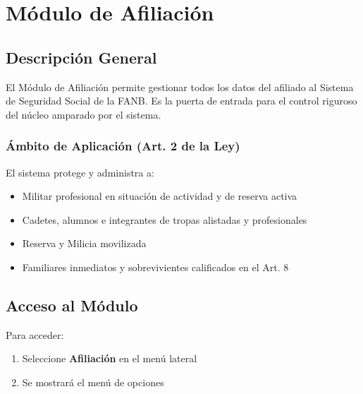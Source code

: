 
\chapter{Módulo de Afiliación}
\label{ch:afiliacion}

\section{Descripción General}

El Módulo de Afiliación permite gestionar todos los datos del afiliado al Sistema de Seguridad Social de la FANB. Es la puerta de entrada para el control riguroso del núcleo amparado por el sistema.

\subsection*{Ámbito de Aplicación (Art. 2 de la Ley)}

El sistema protege y administra a:

\begin{itemize}[leftmargin=*]
    \item Militar profesional en situación de actividad y de reserva activa
    \item Cadetes, alumnos e integrantes de tropas alistadas y profesionales
    \item Reserva y Milicia movilizada
    \item Familiares inmediatos y sobrevivientes calificados en el Art. 8
\end{itemize}

\section{Acceso al Módulo}

Para acceder:

\begin{enumerate}[leftmargin=*]
    \item Seleccione \textbf{Afiliación} en el menú lateral
    \item Se mostrará el menú de opciones
\end{enumerate}

